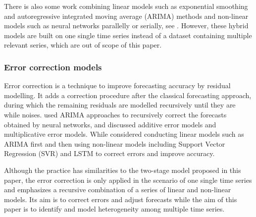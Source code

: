     There is also some work combining linear models such as exponential smoothing and autoregressive integrated moving average (ARIMA) methods and non-linear models such as neural networks parallelly or serially, see \citet{Hajirahimi2019, Zhang2003}. However, these hybrid models are built on one single time series instead of a dataset containing multiple relevant series, which are out of scope of this paper.
    
    \subsubsection{Error correction models}
    Error correction is a technique to improve forecasting accuracy by residual modelling. It adds a correction procedure after the classical forecasting approach, during which the remaining residuals are modelled recursively until they are while noises. \citet{Firmino2015} used ARIMA approaches to recursively correct the forecasts obtained by neural networks, and discussed additive error models and multiplicative error models. While \citet{Silva2019} considered conducting linear models such as ARIMA first and then using non-linear models including Support Vector Regression (SVR) and LSTM to correct errors and improve accuracy.
    
    Although the practice has similarities to the two-stage model proposed in this paper, the error correction is only applied in the scenario of one single time series and emphasizes a recursive combination of a series of linear and non-linear models. Its aim is to correct errors and adjust forecasts while the aim of this paper is to identify and model heterogeneity among multiple time series.
